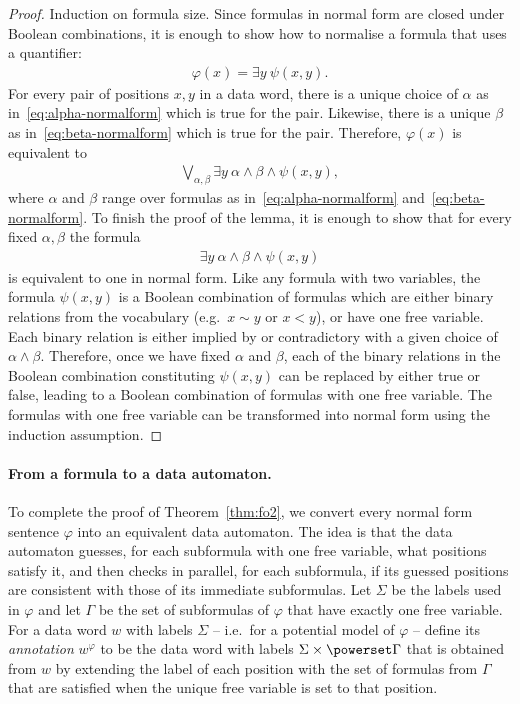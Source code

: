 \begin{proof}
	Induction on formula size. Since formulas in normal form are closed under Boolean combinations, it is enough to show how to normalise a formula that uses a quantifier:
		 \begin{align*}
		\varphi(x) = \exists y\ \psi(x,y).
		\end{align*}
		For every pair of positions $x,y$ in a data word, there is a unique choice of $\alpha$ as in~\eqref{eq:alpha-normalform} which is true for the pair. Likewise, there is a unique $\beta$ as in~\eqref{eq:beta-normalform} which is true for the pair. Therefore, $\varphi(x)$ is equivalent to 
		\begin{align*}
			 \bigvee_{\alpha,\beta} \exists y\ \alpha \land \beta \land \psi(x,y),
			\end{align*}
			where $\alpha$ and $\beta$ range over formulas as in~\eqref{eq:alpha-normalform} and~\eqref{eq:beta-normalform}. 
			To finish the proof of the lemma, it is enough to show that for every fixed $\alpha, \beta$ the formula 
			\begin{align*}
				\exists y\ \alpha \land \beta \land \psi(x,y)
			\end{align*}
is equivalent to one in normal form. 
			Like any formula with two variables, the formula $\psi(x,y)$ is a Boolean combination of formulas which are either binary relations from the vocabulary (e.g.~$x \sim y$ or $x < y$), or have one free variable. Each binary relation is either implied by or contradictory with a given choice of $\alpha \land \beta$. Therefore, once we have fixed $\alpha$ and $\beta$, each of the binary relations in the Boolean combination constituting $\psi(x,y)$ can be replaced by either true or false, leading to a Boolean combination of formulas with one free variable. The formulas with one free variable can be transformed into normal form using the induction assumption. 
\end{proof}

 
\paragraph*{From a formula to a data automaton.} To complete the proof of Theorem~\ref{thm:fo2}, we convert every normal form sentence $\varphi$ into an equivalent data automaton. The idea is that the data automaton guesses, for each subformula with one free variable, what positions satisfy it, and then checks in parallel, for each subformula, if its guessed positions are consistent with those of its immediate subformulas. Let $\Sigma$ be the labels used in $\varphi$ and let $\Gamma$ be the set of subformulas of $\varphi$ that have exactly one free variable. 
For a data word $w$ with labels $\Sigma$ -- i.e.~for a potential model of $\varphi$ -- define its \emph{annotation} $w^\varphi$ to be the data word with labels $\Sigma \times \powerset \Gamma$ that is obtained from $w$ by extending the label of each position with the set of formulas from $\Gamma$ that are satisfied when the unique free variable is set to that position. 

